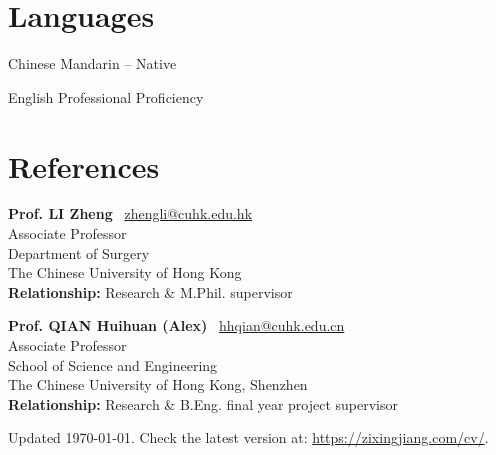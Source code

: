 \documentclass[11pt,letterpaper]{report}
\newcommand{\listitemspace}{0.25em}
\renewenvironment{itemize}
{\begin{list}{}{\setlength{\leftmargin}{0em}
			\setlength{\parskip}{0em}
			\setlength{\itemsep}{\listitemspace}
			\setlength{\parsep}{\listitemspace}}}
	{\end{list}}
\begin{document}
\section*{Languages}
\begin{tablist}
	\item[Chinese] \tab Mandarin -- Native
	\item[English] \tab Professional Proficiency
\end{tablist}
\newpage
\section*{References}
\begin{itemize}
	\item \textbf{Prof. LI Zheng} ~{\scriptsize \faEnvelope}\href{mailto:zhengli@cuhk.edu.hk}{zhengli@cuhk.edu.hk}\\
	Associate Professor\\
	Department of Surgery\\
	The Chinese University of Hong Kong\\
	\vspace{\listitemspace}
	\textbf{Relationship:} Research \& M.Phil. supervisor

	\vspace{10pt}
	\item \textbf{Prof. QIAN Huihuan (Alex)} ~{\scriptsize \faEnvelope}\href{mailto:hhqian@cuhk.edu.cn}{hhqian@cuhk.edu.cn}\\
	Associate Professor\\School of Science and Engineering\\The Chinese University of Hong Kong, Shenzhen\\
	\vspace{\listitemspace}
	\textbf{Relationship:} Research \& B.Eng. final year project supervisor

\end{itemize}
	
\begin{center}
	\vfill
	Updated \monthyeardate\today. Check the latest version at:  \href{https://zixingjiang.com/cv/}{https://zixingjiang.com/cv/}.
\end{center}
	
\end{document}
